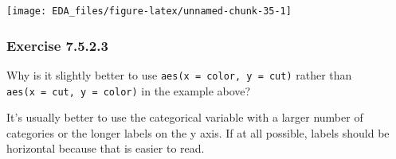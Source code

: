 \documentclass[]{book}
\newenvironment{Shaded}{\begin{snugshade}}{\end{snugshade}}
\newcommand{\DataTypeTok}[1]{\textcolor[rgb]{0.13,0.29,0.53}{#1}}
\newcommand{\DecValTok}[1]{\textcolor[rgb]{0.00,0.00,0.81}{#1}}
\newcommand{\KeywordTok}[1]{\textcolor[rgb]{0.13,0.29,0.53}{\textbf{#1}}}
\newcommand{\NormalTok}[1]{#1}
\newcommand{\OperatorTok}[1]{\textcolor[rgb]{0.81,0.36,0.00}{\textbf{#1}}}
\newcommand{\OtherTok}[1]{\textcolor[rgb]{0.56,0.35,0.01}{#1}}
\newcommand{\StringTok}[1]{\textcolor[rgb]{0.31,0.60,0.02}{#1}}
\theoremstyle{plain}
\theoremstyle{remark}
\begin{document}
\begin{Shaded}
\end{Shaded}

\begin{center}\texttt{[image: EDA\_files/figure-latex/unnamed-chunk-35-1]} \end{center}

\hypertarget{exercise-7.5.2.3}{%
\subsubsection*{\texorpdfstring{Exercise
{7.5.2.3}}{Exercise 7.5.2.3}}\label{exercise-7.5.2.3}}

Why is it slightly better to use \texttt{aes(x\ =\ color,\ y\ =\ cut)}
rather than \texttt{aes(x\ =\ cut,\ y\ =\ color)} in the example above?

It's usually better to use the categorical variable with a larger number
of categories or the longer labels on the y axis. If at all possible,
labels should be horizontal because that is easier to read.
\end{document}
